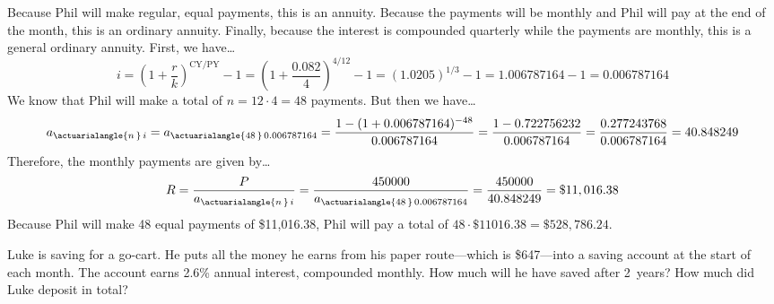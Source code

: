 \documentclass[11pt,letterpaper]{article}
\begin{document}
\sol Because Phil will make regular, equal payments, this is an annuity. Because the payments will be monthly and Phil will pay at the end of the month, this is an ordinary annuity. Finally, because the interest is compounded quarterly while the payments are monthly, this is a general ordinary annuity. First, we have\dots
	\[
	i= \left(1 + \dfrac{r}{k} \right)^{\text{CY}/\text{PY}} - 1= \left(1 + \dfrac{0.082}{4} \right)^{4/12} - 1= (1.0205)^{1/3} - 1= 1.006787164 - 1= 0.006787164
	\]
We know that Phil will make a total of $n= 12 \cdot 4= 48$ payments. But then we have\dots
	\[
	a_{\actuarialangle{n\,}\, i}= a_{\actuarialangle{48\,}\, 0.006787164}= \dfrac{1 - (1 + 0.006787164)^{-48}}{0.006787164}= \dfrac{1 - 0.722756232}{0.006787164}= \dfrac{0.277243768}{0.006787164}= 40.848249
	\]
Therefore, the monthly payments are given by\dots
	\[
	R= \dfrac{P}{a_{\actuarialangle{n\,}\, i}}= \dfrac{450000}{a_{\actuarialangle{48\,}\, 0.006787164}}= \dfrac{450000}{40.848249}= \$11,016.38
	\]
Because Phil will make 48 equal payments of \$11,016.38, Phil will pay a total of $48 \cdot \$11016.38= \$528,786.24$. 




\newpage



 Luke is saving for a go-cart. He puts all the money he earns from his paper route---which is \$647---into a saving account at the start of each month. The account earns 2.6\% annual interest, compounded monthly. How much will he have saved after 2~years? How much did Luke deposit in total? \pspace
\end{document}
